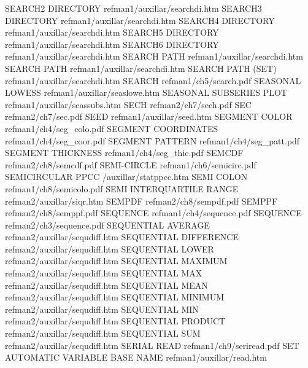 SEARCH2 DIRECTORY                       refman1/auxillar/searchdi.htm
SEARCH3 DIRECTORY                       refman1/auxillar/searchdi.htm
SEARCH4 DIRECTORY                       refman1/auxillar/searchdi.htm
SEARCH5 DIRECTORY                       refman1/auxillar/searchdi.htm
SEARCH6 DIRECTORY                       refman1/auxillar/searchdi.htm
SEARCH PATH                             refman1/auxillar/searchdi.htm
SEARCH PATH                             refman1/auxillar/searchdi.htm
SEARCH PATH (SET)                       refman1/auxillar/searchdi.htm
SEARCH                                  refman1/ch5/search.pdf
SEASONAL LOWESS                         refman1/auxillar/seaslowe.htm
SEASONAL SUBSERIES PLOT                 refman1/auxillar/seassubs.htm
SECH                                    refman2/ch7/sech.pdf
SEC                                     refman2/ch7/sec.pdf
SEED                                    refman1/auxillar/seed.htm
SEGMENT COLOR                           refman1/ch4/seg_colo.pdf
SEGMENT COORDINATES                     refman1/ch4/seg_coor.pdf
SEGMENT PATTERN                         refman1/ch4/seg_patt.pdf
SEGMENT THICKNESS                       refman1/ch4/seg_thic.pdf
SEMCDF                                  refman2/ch8/semcdf.pdf
SEMI-CIRCLE                             refman1/ch6/semicirc.pdf
SEMICIRCULAR PPCC                       /auxillar/statppcc.htm
SEMI COLON                              refman1/ch8/semicolo.pdf
SEMI INTERQUARTILE RANGE                refman2/auxillar/siqr.htm
SEMPDF                                  refman2/ch8/sempdf.pdf
SEMPPF                                  refman2/ch8/semppf.pdf
SEQUENCE                                refman1/ch4/sequence.pdf
SEQUENCE                                refman2/ch3/sequence.pdf
SEQUENTIAL AVERAGE                      refman2/auxillar/sequdiff.htm
SEQUENTIAL DIFFERENCE                   refman2/auxillar/sequdiff.htm
SEQUENTIAL LOWER                        refman2/auxillar/sequdiff.htm
SEQUENTIAL MAXIMUM                      refman2/auxillar/sequdiff.htm
SEQUENTIAL MAX                          refman2/auxillar/sequdiff.htm
SEQUENTIAL MEAN                         refman2/auxillar/sequdiff.htm
SEQUENTIAL MINIMUM                      refman2/auxillar/sequdiff.htm
SEQUENTIAL MIN                          refman2/auxillar/sequdiff.htm
SEQUENTIAL PRODUCT                      refman2/auxillar/sequdiff.htm
SEQUENTIAL SUM                          refman2/auxillar/sequdiff.htm
SERIAL READ                             refman1/ch9/seriread.pdf
SET AUTOMATIC VARIABLE BASE NAME        refman1/auxillar/read.htm
